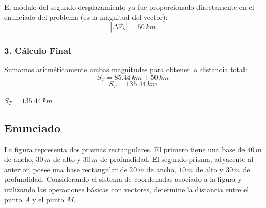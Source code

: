 \documentclass[12pt, a4paper]{article}
\begin{document}
El módulo del segundo desplazamiento ya fue proporcionado directamente en el enunciado del problema (es la magnitud del vector):
$$ |\Delta\vec{r}_2| = 50 \, \si{km} $$

\subsubsection*{3. Cálculo Final}
Sumamos aritméticamente ambas magnitudes para obtener la distancia total:
$$ S_T = 85.44 \, \si{km} + 50 \, \si{km} $$
$$ S_T = 135.44 \, \si{km} $$

\begin{tcolorbox}[colback=green!5!white, colframe=green!50!black, title=Respuesta Final]
\centering \Large $S_T = 135.44 \, \si{km}$
\end{tcolorbox}

\newpage

\subsection*{Enunciado}
La figura representa dos prismas rectangulares. El primero tiene una base de $40 \, \si{m}$ de ancho, $30 \, \si{m}$ de alto y $30 \, \si{m}$ de profundidad. El segundo prisma, adyacente al anterior, posee una base rectangular de $20 \, \si{m}$ de ancho, $10 \, \si{m}$ de alto y $30 \, \si{m}$ de profundidad. Considerando el sistema de coordenadas asociado a la figura y utilizando las operaciones básicas con vectores, determine la distancia entre el punto $A$ y el punto $M$.
\end{document}
